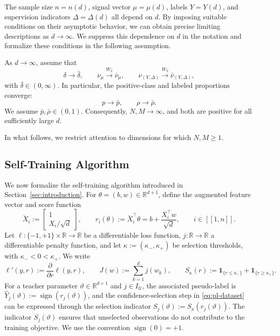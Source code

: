 The sample size $n=n(d)$, signal vector $\mu=\mu(d)$,
labels $Y=Y(d)$, and supervision indicators
$\Delta=\Delta(d)$ all depend on $d$.
By imposing suitable conditions on their asymptotic behavior,
we can obtain precise limiting descriptions as $d\to\infty$.
We suppress this dependence on $d$ in the notation and
formalize these conditions in the following assumption.
\begin{assumption}
\label{assumption:asymptotic-regime}
As $d\to\infty$, assume that
\begin{equation}
    \delta\longrightarrow\bar\delta,
    \qquad
    \nu_\mu\xrightarrow{W_2}\bar\nu_\mu,
    \qquad
    \nu_{(Y,\Delta)}
    \xrightarrow{W_2}\bar\nu_{(Y,\Delta)},
    \label{eq:finite-dim-limits}
\end{equation}
with $\bar \delta\in(0,\infty)$.
In particular, the positive-class and labeled proportions
converge:
\begin{equation}
    p\longrightarrow\bar p,
    \qquad
    \rho\longrightarrow\bar\rho.
    \label{eq:finite-dim-limits-2}
\end{equation}
We assume $\bar p,\bar\rho\in(0,1)$.
Consequently, $N,M\to\infty$, and both are positive
for all sufficiently large $d$.
\end{assumption}
In what follows, we restrict attention to dimensions
for which $N,M\ge1$.

\subsection{Self-Training Algorithm}

We now formalize the self-training algorithm introduced in
Section~\ref{sec:introduction}.
For $\theta=(b,w)\in\mathbb R^{d+1}$, define the
augmented feature vector and score function
\[
    \breve X_i
    :=
    \begin{bmatrix}
        1\\
        X_i/\sqrt d
    \end{bmatrix},
    \qquad
    r_i(\theta)
    :=
    \breve X_i^\top\theta
    =
    b+\frac{X_i^\top w}{\sqrt d},
    \qquad
    i \in [\![1,n]\!].
\]
Let $\ell:\{-1,+1\}\times\mathbb R\to\mathbb R$
be a differentiable loss function,
$j:\mathbb R\to\mathbb R$ a differentiable penalty function, and let $\kappa := (\kappa_-,\kappa_+)$ be selection thresholds, with $\kappa_- < 0 < \kappa_+$.
We write
\[
    \ell'(y,r)
    :=
    \frac{\partial}{\partial r}\ell(y,r),
    \qquad
    J(w):=\sum_{k=1}^d j(w_k),
    \qquad 
    S_\kappa(r) := \mathbf1_{ \{ r \le \kappa_-\} } + \mathbf1_{ \{ r \ge \kappa_+\} }.
\]
For a teacher parameter $\vartheta \in \mathbb{R}^{d+1}$ and $j \in I_{\mathcal U}$, the associated pseudo-label is $\widehat Y_j(\vartheta):=\operatorname{sign}(r_j(\vartheta))$, and
the confidence-selection step in \eqref{eq:pl-dataset}
can be expressed through the selection indicator $S_j(\vartheta) := S_\kappa(r_j(\vartheta))$. 
The indicator $S_j(\vartheta)$ ensures that unselected
observations do not contribute to the training objective.
We use the convention $\operatorname{sign}(0)=+1$.


